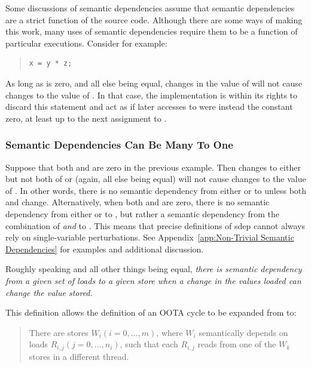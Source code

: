 \documentclass[10]{article}
\begin{document}
Some discussions of semantic dependencies assume that semantic
dependencies are a strict function of the source code.
Although there are some ways of making this work, many uses of
semantic dependencies require them to be a function of particular
executions.
Consider for example:

\begin{quote}
\begin{verbatim}
x = y * z;
\end{verbatim}
\end{quote}

As long as  is zero, and all else being equal, changes in the
value of  will not cause changes to the value of .
In that case, the implementation is within its rights to discard this
statement and act as if later accesses to  were instead the
constant zero, at least up to the next assignment to .

\subsubsection{Semantic Dependencies Can Be Many To One}
\label{sec:Semantic Dependencies Can Be Many To One}

Suppose that both  and  are zero in the previous example.
Then changes to either but not both of  or  (again, all
else being equal) will not cause changes to the value of .
In other words, there is no semantic dependency from either 
or  to  unless both  and  change.
Alternatively, when both  and  are zero, there is no semantic
dependency from either  or  to , but rather a semantic
dependency from the combination of  \emph{and}  to .
This means that precise definitions of sdep cannot always rely on
single-variable perturbations.
See Appendix~\ref{app:Non-Trivial Semantic Dependencies}
for examples and additional discussion.

Roughly speaking and all other things being equal, \emph{there is semantic
dependency from a given set of loads to a given store when a change in
the values loaded can change the value stored.}

This definition allows the definition of an OOTA cycle to be expanded
from  to:

\begin{quote}
	There are stores
	$W_i (i = 0, ..., m)$,
	where $W_i$ semantically depends on loads
	$R_{i,j} (j = 0, ..., n_i)$,
	such that each $R_{i,j}$ reads from one of the $W_k$
	stores in a different thread.
\end{quote}
\end{document}
